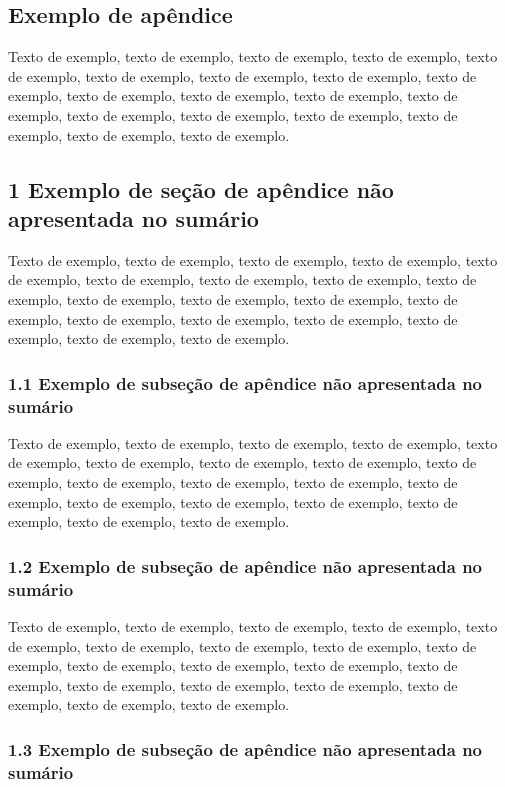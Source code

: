 \documentclass[
	12pt,				%
	oneside,			%
	a4paper,			%
	english,			%
	brazil				%
	]{abntex2ppgsi}
\begin{document}
\begin{apendicesenv}
\chapter{Exemplo de apêndice}

Texto de exemplo, texto de exemplo, texto de exemplo, texto de exemplo, texto de exemplo, texto de exemplo, texto de exemplo, texto de exemplo, texto de exemplo, texto de exemplo, texto de exemplo, texto de exemplo, texto de exemplo, texto de exemplo, texto de exemplo, texto de exemplo, texto de exemplo, texto de exemplo, texto de exemplo.

\section*{1 Exemplo de seção de apêndice não apresentada no sumário}

Texto de exemplo, texto de exemplo, texto de exemplo, texto de exemplo, texto de exemplo, texto de exemplo, texto de exemplo, texto de exemplo, texto de exemplo, texto de exemplo, texto de exemplo, texto de exemplo, texto de exemplo, texto de exemplo, texto de exemplo, texto de exemplo, texto de exemplo, texto de exemplo, texto de exemplo.

\subsection*{1.1 Exemplo de subseção de apêndice não apresentada no sumário}

Texto de exemplo, texto de exemplo, texto de exemplo, texto de exemplo, texto de exemplo, texto de exemplo, texto de exemplo, texto de exemplo, texto de exemplo, texto de exemplo, texto de exemplo, texto de exemplo, texto de exemplo, texto de exemplo, texto de exemplo, texto de exemplo, texto de exemplo, texto de exemplo, texto de exemplo.

\subsection*{1.2 Exemplo de subseção de apêndice não apresentada no sumário}

Texto de exemplo, texto de exemplo, texto de exemplo, texto de exemplo, texto de exemplo, texto de exemplo, texto de exemplo, texto de exemplo, texto de exemplo, texto de exemplo, texto de exemplo, texto de exemplo, texto de exemplo, texto de exemplo, texto de exemplo, texto de exemplo, texto de exemplo, texto de exemplo, texto de exemplo.

\subsection*{1.3 Exemplo de subseção de apêndice não apresentada no sumário}


\end{apendicesenv}
\end{document}

